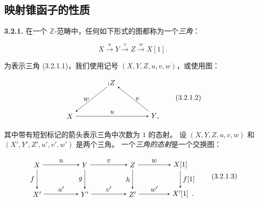\clearpage
{}%
\subsection{映射锥函子的性质}

\noindent\textbf{3.2.1.}\quad
{}
在一个 $\mathbb Z$-范畴中，任何如下形式的图都称为一个\emph{三角}：

\begin{equation}
  X\xrightarrow{u}Y\xrightarrow{v}Z\xrightarrow{w}X[1].
  \tag{3.2.1.1}
\end{equation}

为表示三角 (3.2.1.1)，我们使用记号 $(X,Y,Z,u,v,w)$，或使用图：

\begin{equation}
  \begin{tikzpicture}[>=stealth,baseline=(current bounding box.center)]
    \node (X) at (0,0) {$X$};
    \node (Y) at (4.2,0) {$Y\mathpunct{,}$};
    \node (Z) at (2.1,1.65) {$Z$};
    \draw[->] (X) -- node[above] {$u$} (Y);
    \draw[->] (Y) -- node[right] {$v$} (Z);
    \draw[->] (Z) -- node[left] {$w$} (X);
    \draw[line width=0.45pt] (1.91,1.50) -- (1.91,1.67);
  \end{tikzpicture}
  \tag{3.2.1.2}
\end{equation}

其中带有短划标记的箭头表示三角中次数为 $1$ 的态射。
设 $(X,Y,Z,u,v,w)$ 和 $(X',Y',Z',u',v',w')$ 是两个三角。
一个\emph{三角的态射}是一个交换图：

\begin{equation}
  \begin{tikzpicture}[>=stealth,baseline=(current bounding box.center)]
    \node (X)  at (0,1.45) {$X$};
    \node (Y)  at (2.35,1.45) {$Y$};
    \node (Z)  at (4.70,1.45) {$Z$};
    \node (Xs) at (7.05,1.45) {$X[1]$};
    \node (Xp) at (0,0) {$X'$};
    \node (Yp) at (2.35,0) {$Y'$};
    \node (Zp) at (4.70,0) {$Z'$};
    \node (Xps) at (7.05,0) {$X'[1]$};
    \node[anchor=base west,inner sep=0pt,xshift=.08em] at (Xps.base east) {$.$};
    \draw[->] (X) -- node[above] {$u$} (Y);
    \draw[->] (Y) -- node[above] {$v$} (Z);
    \draw[->] (Z) -- node[above] {$w$} (Xs);
    \draw[->] (Xp) -- node[above] {$u'$} (Yp);
    \draw[->] (Yp) -- node[above] {$v'$} (Zp);
    \draw[->] (Zp) -- node[above] {$w'$} (Xps);
    \draw[->] (X) -- node[left] {$f$} (Xp);
    \draw[->] (Y) -- node[left] {$g$} (Yp);
    \draw[->] (Z) -- node[left] {$h$} (Zp);
    \draw[->] (Xs) -- node[right] {$f[1]$} (Xps);
  \end{tikzpicture}
  \tag{3.2.1.3}
\end{equation}

